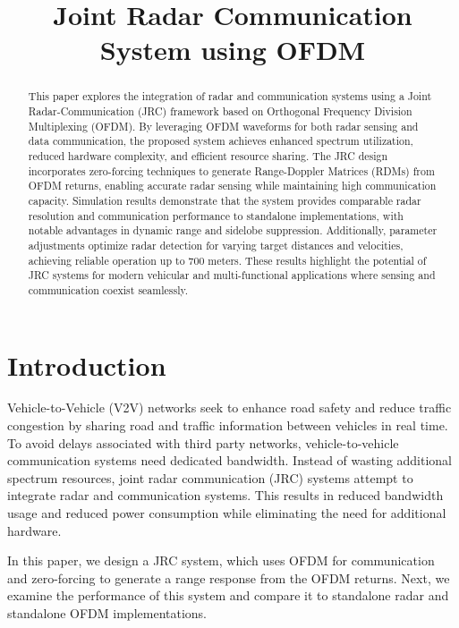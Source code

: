 \documentclass[conference]{IEEEtran}
\title{Joint Radar Communication System using OFDM}
\author{

\IEEEauthorblockN{Owen Sowatzke}
\IEEEauthorblockA{\textit{Electrical Engineering Department} \\
\textit{University of Arizona}\\
Tucson, USA \\
osowatzke@arizona.edu}

\and
\IEEEauthorblockN{Iman Miraki}
\IEEEauthorblockA{\textit{Electrical Engineering Department} \\
\textit{University of Arizona}\\
Tucson, USA \\
imanmiraki@arizona.edu}}
\begin{document}
	\raggedbottom
	\maketitle
	
\begin {abstract}


This paper explores the integration of radar and communication systems using a Joint Radar-Communication (JRC) framework based on Orthogonal Frequency Division Multiplexing (OFDM). By leveraging OFDM waveforms for both radar sensing and data communication, the proposed system achieves enhanced spectrum utilization, reduced hardware complexity, and efficient resource sharing. The JRC design incorporates zero-forcing techniques to generate Range-Doppler Matrices (RDMs) from OFDM returns, enabling accurate radar sensing while maintaining high communication capacity. Simulation results demonstrate that the system provides comparable radar resolution and communication performance to standalone implementations, with notable advantages in dynamic range and sidelobe suppression. Additionally, parameter adjustments optimize radar detection for varying target distances and velocities, achieving reliable operation up to 700 meters. These results highlight the potential of JRC systems for modern vehicular and multi-functional applications where sensing and communication coexist seamlessly.


\end{abstract}



\section {Introduction}
     Vehicle-to-Vehicle (V2V) networks seek to enhance road safety and reduce traffic congestion by sharing road and traffic information between vehicles in real time. To avoid delays associated with third party networks, vehicle-to-vehicle communication systems need dedicated bandwidth. Instead of wasting additional spectrum resources, joint radar communication (JRC) systems attempt to integrate radar and communication systems. This results in reduced bandwidth usage and reduced power consumption while eliminating the need for additional hardware.
     
     In this paper, we design a JRC system, which uses OFDM for communication and zero-forcing to generate a range response from the OFDM returns. Next, we examine the performance of this system and compare it to standalone radar and standalone OFDM implementations.
        
\end{document}
